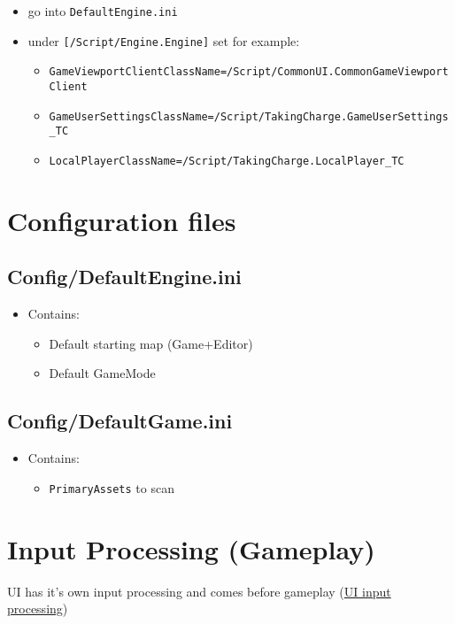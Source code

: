 \documentclass{scrbook}
\newcommand{\code}[1]{\colorbox{mygray}{\lstinline|#1|}}
\begin{document}
            \begin{itemize}
                \item go into \code{DefaultEngine.ini}
                \item under \code{[/Script/Engine.Engine]} set for example:
                \begin{itemize}
                    \item \code{GameViewportClientClassName=/Script/CommonUI.CommonGameViewportClient}
                    \item \code{GameUserSettingsClassName=/Script/TakingCharge.GameUserSettings_TC}
                    \item \code{LocalPlayerClassName=/Script/TakingCharge.LocalPlayer_TC}
                \end{itemize}
            \end{itemize}

    \chapter{Configuration files}
        \section{Config/DefaultEngine.ini}
            \begin{itemize}
                \item Contains:
                \begin{itemize}
                    \item Default starting map (Game+Editor)
                    \item Default GameMode
                \end{itemize}
            \end{itemize}

        \section{Config/DefaultGame.ini}
            \begin{itemize}
                \item Contains:
                \begin{itemize}
                    \item \code{PrimaryAssets} to scan
                \end{itemize}
            \end{itemize}

    \chapter{Input Processing (Gameplay)}
        UI has it's own input processing and comes before gameplay (\hyperlink{input:UI}{UI input processing})\\
\end{document}
